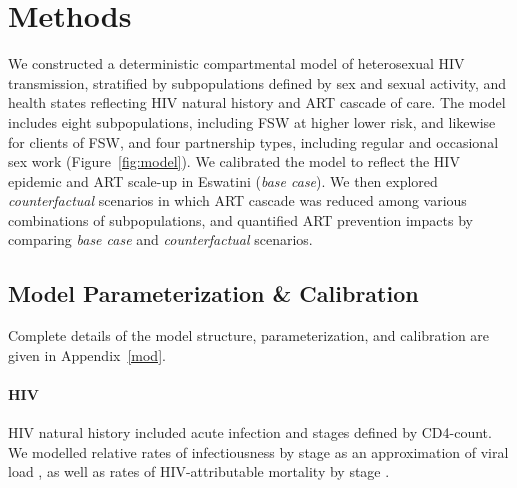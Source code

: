 \section{Methods}\label{art.meth}
We constructed a deterministic compartmental model of heterosexual HIV transmission, stratified by
subpopulations defined by sex and sexual activity, and
health states reflecting HIV natural history and ART cascade of care.
The model includes eight subpopulations,
including FSW at higher \vs lower risk, and likewise for clients of FSW,
and four partnership types, including regular and occasional sex work (Figure~\ref{fig:model}).
We calibrated the model to reflect the HIV epidemic and ART scale-up in Eswatini (\emph{base case}).
We then explored \emph{counterfactual} scenarios in which
ART cascade was reduced among various combinations of subpopulations,
and quantified ART prevention impacts by comparing \emph{base case} and \emph{counterfactual} scenarios.
\subsection{Model Parameterization \& Calibration}\label{art.meth.par}
Complete details of the model structure, parameterization, and calibration are given in Appendix~\ref{mod}.
\paragraph{HIV}
HIV natural history included acute infection and stages defined by CD4-count.
We modelled relative rates of infectiousness by stage
as an approximation of viral load \cite{Boily2009,Donnell2010,Bellan2015},
as well as rates of HIV-attributable mortality by stage \cite{Mangal2017}.
